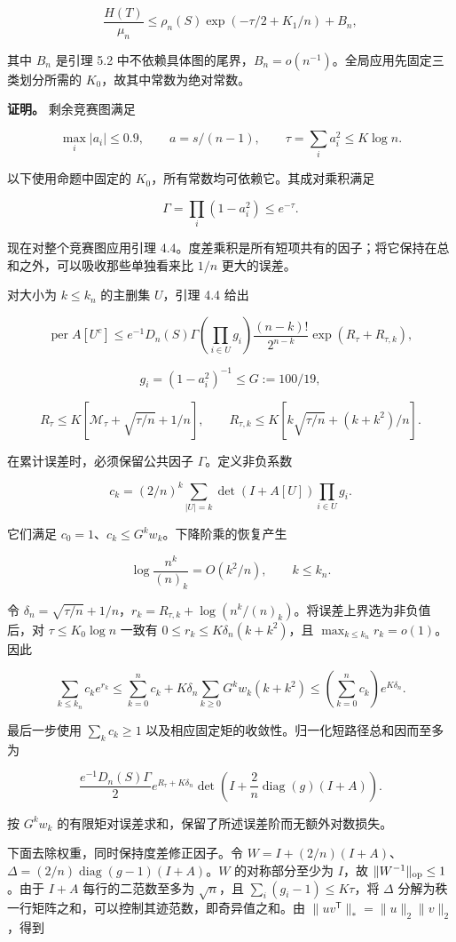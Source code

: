 \documentclass[11pt,a4paper]{article}
\begin{document}
\[
\frac{H(T)}{\mu_n}\le\rho_n(S)\exp(-\tau/2+K_1/n)+B_n,
\]

其中 \(B_n\) 是引理 5.2 中不依赖具体图的尾界，\(B_n=o(n^{-1})\)。全局应用先固定三类划分所需的 \(K_0\)，故其中常数为绝对常数。

\textbf{证明。} 剩余竞赛图满足

\[
\max_i|a_i|\le0.9,\qquad
a=s/(n-1),\qquad \tau=\sum_i a_i^2\le K\log n.
\]

以下使用命题中固定的 \(K_0\)，所有常数均可依赖它。其成对乘积满足

\[
\Gamma=\prod_i(1-a_i^2)\le e^{-\tau}.
\]

现在对整个竞赛图应用引理 4.4。度差乘积是所有短项共有的因子；将它保持在总和之外，可以吸收那些单独看来比 \(1/n\) 更大的误差。

对大小为 \(k\le k_n\) 的主删集 \(U\)，引理 4.4 给出

\[
\operatorname{per}A[U^c]\le
e^{-1}D_n(S)\Gamma
\left(\prod_{i\in U}g_i\right)
\frac{(n-k)!}{2^{n-k}}\exp(R_\tau+R_{\tau,k}),
\]

\[
g_i=(1-a_i^2)^{-1}\le G:=100/19,
\]

\[
R_\tau\le K[\mathcal M_\tau+\sqrt{\tau/n}+1/n],\qquad
R_{\tau,k}\le K[k\sqrt{\tau/n}+(k+k^2)/n].
\]

在累计误差时，必须保留公共因子 \(\Gamma\)。定义非负系数

\[
c_k=(2/n)^k\sum_{|U|=k}\det(I+A[U])\prod_{i\in U}g_i.
\]

它们满足 \(c_0=1\)、\(c_k\le G^kw_k\)。下降阶乘的恢复产生

\[
\log\frac{n^k}{(n)_k}=O(k^2/n),\qquad k\le k_n.
\]

令 \(\delta_n=\sqrt{\tau/n}+1/n\)，\(r_k=R_{\tau,k}+\log(n^k/(n)_k)\)。将误差上界选为非负值后，对 \(\tau\le K_0\log n\) 一致有 \(0\le r_k\le K\delta_n(k+k^2)\)，且 \(\max_{k\le k_n}r_k=o(1)\)。因此

\[
\sum_{k\le k_n}c_ke^{r_k}
\le\sum_{k=0}^{n}c_k+
K\delta_n\sum_{k\ge0}G^kw_k(k+k^2)
\le\left(\sum_{k=0}^{n}c_k\right)e^{K\delta_n}.
\]

最后一步使用 \(\sum_kc_k\ge1\) 以及相应固定矩的收敛性。归一化短路径总和因而至多为

\[
\frac{e^{-1}D_n(S)\Gamma}{2}
e^{R_\tau+K\delta_n}
\det\left(I+\frac2n\operatorname{diag}(g)(I+A)\right).
\]

按 \(G^kw_k\) 的有限矩对误差求和，保留了所述误差阶而无额外对数损失。

下面去除权重，同时保持度差修正因子。令 \(W=I+(2/n)(I+A)\)、\(\Delta=(2/n)\operatorname{diag}(g-1)(I+A)\)。\(W\) 的对称部分至少为 \(I\)，故 \(\|W^{-1}\|_{\rm op}\le1\)。由于 \(I+A\) 每行的二范数至多为 \(\sqrt n\)，且 \(\sum_i(g_i-1)\le K\tau\)，将 \(\Delta\) 分解为秩一行矩阵之和，可以控制其迹范数，即奇异值之和。由 \(\|uv^{\mathsf T}\|_*=\|u\|_2\|v\|_2\)，得到
\end{document}
